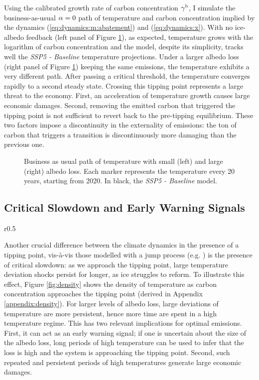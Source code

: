 \documentclass[../../main.tex]{subfiles}
\begin{document}
Using the calibrated growth rate of carbon concentration $\gamma^{\mathrm{b}}$, I simulate the business-as-usual $\alpha = 0$ path of temperature and carbon concentration implied by the dynamics (\ref{eq:dynamics:m:abatement}) and (\ref{eq:dynamics:x}). With no ice-albedo feedback (left panel of Figure \ref{fig:bau}), as expected, temperature grows with the logarithm of carbon concentration and the model, despite its simplicity, tracks well the \textit{SSP5 - Baseline} temperature projections. Under a larger albedo loss (right panel of Figure \ref{fig:bau}) keeping the same emissions, the temperature exhibits a very different path. After passing a critical threshold, the temperature converges rapidly to a second steady state. Crossing this tipping point represents a large threat to the economy. First, an acceleration of temperature growth causes large economic damages. Second, removing the emitted carbon that triggered the tipping point is not sufficient to revert back to the pre-tipping equilibrium. These two factors impose a discontinuity in the externality of emissions: the ton of carbon that triggers a transition is discontinuously more damaging than the previous one.

\begin{figure}[H]
    \centering
    \caption{Business as usual path of temperature with small (left) and large (right) albedo loss. Each marker represents the temperature every 20 years, starting from 2020. In black, the \textit{SSP5 - Baseline} model.}
    \label{fig:bau}
\end{figure}

\subsection{Critical Slowdown and Early Warning Signals}

\begin{wrapfigure}{r}{0.5\textwidth}
    \centering
    \caption{Density of temperature shocks at $M = 600$.}
    \label{fig:density}
\end{wrapfigure}
Another crucial difference between the climate dynamics in the presence of a tipping point, vis-à-vis those modelled with a jump process (e.g. \citealt{dietz_economic_2021,hambel_optimal_2021}) is the presence of critical slowdown: as we approach the tipping point, large temperature deviation shocks persist for longer, as ice struggles to reform. To illustrate this effect, Figure \ref{fig:density} shows the density of temperature as carbon concentration approaches the tipping point (derived in Appendix \ref{appendix:density}). For larger levels of albedo loss, large deviations of temperature are more persistent, hence more time are spent in a high temperature regime. This has two relevant implications for optimal emissions. First, it can act as an early warning signal; if one is uncertain about the size of the albedo loss, long periods of high temperature can be used to infer that the loss is high and the system is approaching the tipping point. Second, such repeated and persistent periods of high temperatures generate large economic damages.
\end{document}
